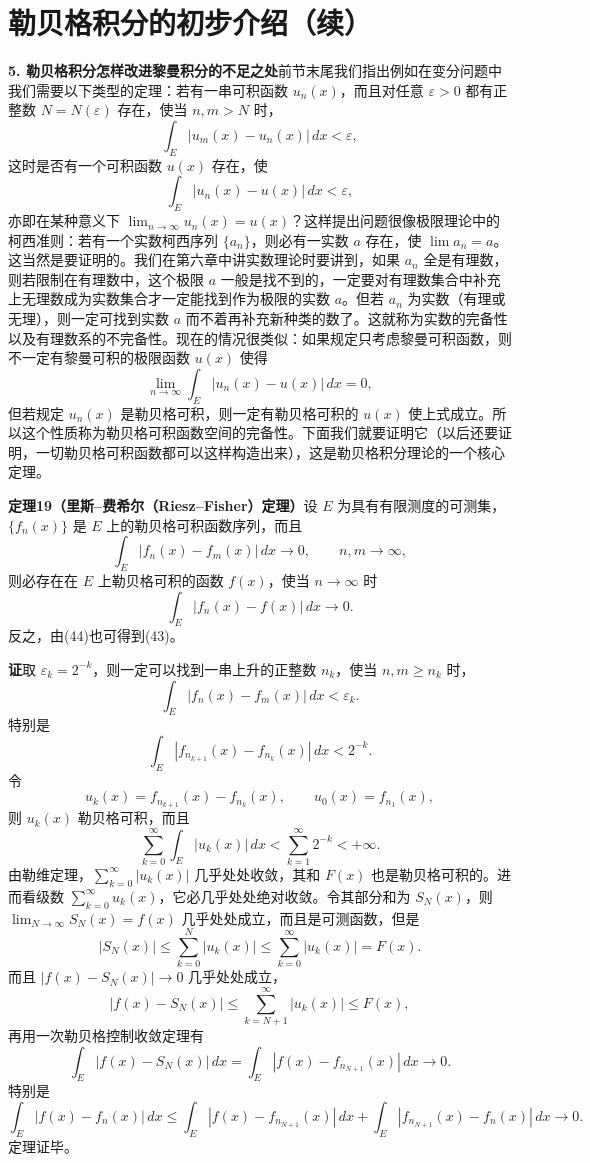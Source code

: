 \section{勒贝格积分的初步介绍（续）}

\noindent\textbf{5. 勒贝格积分怎样改进黎曼积分的不足之处}\quad 前节末尾我们指出例如在变分问题中我们需要以下类型的定理：若有一串可积函数 $u_n(x)$，而且对任意 $\varepsilon>0$ 都有正整数 $N=N(\varepsilon)$ 存在，使当 $n,m>N$ 时，
\[
 \int_E|u_m(x)-u_n(x)|\,dx<\varepsilon,
\]
这时是否有一个可积函数 $u(x)$ 存在，使
\[
 \int_E|u_n(x)-u(x)|\,dx<\varepsilon,
\]
亦即在某种意义下 $\lim_{n\to\infty}u_n(x)=u(x)$？这样提出问题很像极限理论中的柯西准则：若有一个实数柯西序列 $\{a_n\}$，则必有一实数 $a$ 存在，使 $\lim a_n=a$。这当然是要证明的。我们在第六章中讲实数理论时要讲到，如果 $a_n$ 全是有理数，则若限制在有理数中，这个极限 $a$ 一般是找不到的，一定要对有理数集合中补充上无理数成为实数集合才一定能找到作为极限的实数 $a$。但若 $a_n$ 为实数（有理或无理），则一定可找到实数 $a$ 而不着再补充新种类的数了。这就称为实数的完备性以及有理数系的不完备性。现在的情况很类似：如果规定只考虑黎曼可积函数，则不一定有黎曼可积的极限函数 $u(x)$ 使得
\[
 \lim_{n\to\infty}\int_E|u_n(x)-u(x)|\,dx=0,
\]
但若规定 $u_n(x)$ 是勒贝格可积，则一定有勒贝格可积的 $u(x)$ 使上式成立。所以这个性质称为勒贝格可积函数空间的完备性。下面我们就要证明它（以后还要证明，一切勒贝格可积函数都可以这样构造出来），这是勒贝格积分理论的一个核心定理。

\noindent\textbf{定理19（里斯--费希尔（Riesz--Fisher）定理）}\quad 设 $E$ 为具有有限测度的可测集，$\{f_n(x)\}$ 是 $E$ 上的勒贝格可积函数序列，而且
\begin{equation}
 \int_E|f_n(x)-f_m(x)|\,dx\to0,\qquad n,m\to\infty,
 \tag{43}
\end{equation}
则必存在在 $E$ 上勒贝格可积的函数 $f(x)$，使当 $n\to\infty$ 时
\begin{equation}
 \int_E|f_n(x)-f(x)|\,dx\to0.
 \tag{44}
\end{equation}
反之，由(44)也可得到(43)。

\noindent\textbf{证}\quad 取 $\varepsilon_k=2^{-k}$，则一定可以找到一串上升的正整数 $n_k$，使当 $n,m\ge n_k$ 时，
\[
 \int_E|f_n(x)-f_m(x)|\,dx<\varepsilon_k.
\]
特别是
\[
 \int_E|f_{n_{k+1}}(x)-f_{n_k}(x)|\,dx<2^{-k}.
\]
令
\[
 u_k(x)=f_{n_{k+1}}(x)-f_{n_k}(x),\qquad u_0(x)=f_{n_1}(x),
\]
则 $u_k(x)$ 勒贝格可积，而且
\[
 \sum_{k=0}^{\infty}\int_E|u_k(x)|\,dx<\sum_{k=1}^{\infty}2^{-k}<+\infty.
\]
由勒维定理，$\sum_{k=0}^{\infty}|u_k(x)|$ 几乎处处收敛，其和 $F(x)$ 也是勒贝格可积的。进而看级数 $\sum_{k=0}^{\infty}u_k(x)$，它必几乎处处绝对收敛。令其部分和为 $S_N(x)$，则 $\lim_{N\to\infty}S_N(x)=f(x)$ 几乎处处成立，而且是可测函数，但是
\[
 |S_N(x)|\le\sum_{k=0}^{N}|u_k(x)|\le\sum_{k=0}^{\infty}|u_k(x)|=F(x).
\]
而且 $|f(x)-S_N(x)|\to0$ 几乎处处成立，
\[
 |f(x)-S_N(x)|\le\sum_{k=N+1}^{\infty}|u_k(x)|\le F(x),
\]
再用一次勒贝格控制收敛定理有
\[
 \int_E|f(x)-S_N(x)|\,dx
 =\int_E|f(x)-f_{n_{N+1}}(x)|\,dx\to0.
\]
特别是
\[
 \int_E|f(x)-f_n(x)|\,dx
 \le\int_E|f(x)-f_{n_{N+1}}(x)|\,dx
 +\int_E|f_{n_{N+1}}(x)-f_n(x)|\,dx\to0.
\]
定理证毕。

